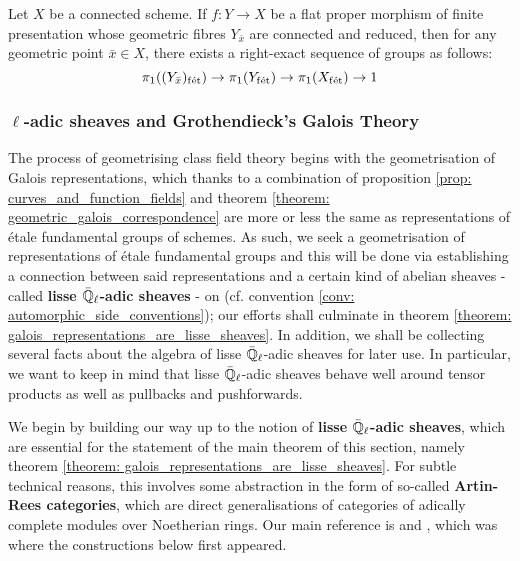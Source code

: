             \begin{proposition} \label{prop: etale_homotopy_exact_sequence}
                \cite[\href{https://stacks.math.columbia.edu/tag/0C0J}{Tag 0C0J}]{stacks} Let $X$ be a connected scheme. If $f: Y \to X$ be a flat proper morphism of finite presentation whose geometric fibres $Y_{\bar{x}}$ are connected and reduced, then for any geometric point $\bar{x} \in X$, there exists a right-exact sequence of groups as follows:
                    $$\pi_1((Y_{\bar{x}})_{\mathrm{f\acute{e}t}}) \to \pi_1(Y_{\mathrm{f\acute{e}t}}) \to \pi_1(X_{\mathrm{f\acute{e}t}}) \to 1$$
            \end{proposition}
        
        \subsubsection{\texorpdfstring{$\ell$}{}-adic sheaves and Grothendieck's Galois Theory}
            The process of geometrising class field theory begins with the geometrisation of Galois representations, which thanks to a combination of proposition \ref{prop: curves_and_function_fields} and theorem \ref{theorem: geometric_galois_correspondence} are more or less the same as representations of \'etale fundamental groups of schemes. As such, we seek a geometrisation of representations of \'etale fundamental groups and this will be done via establishing a connection between said representations and a certain kind of abelian sheaves - called \textbf{lisse $\bar{\mathbb{Q}}_{\ell}$-adic sheaves} - on  (cf. convention \ref{conv: automorphic_side_conventions}); our efforts shall culminate in theorem \ref{theorem: galois_representations_are_lisse_sheaves}. In addition, we shall be collecting several facts about the algebra of lisse $\bar{\mathbb{Q}}_{\ell}$-adic sheaves for later use. In particular, we want to keep in mind that lisse $\bar{\mathbb{Q}}_{\ell}$-adic sheaves behave well around tensor products as well as pullbacks and pushforwards.  
            
            We begin by building our way up to the notion of \textbf{lisse $\bar{\mathbb{Q}}_{\ell}$-adic sheaves}, which are essential for the statement of the main theorem of this section, namely theorem \ref{theorem: galois_representations_are_lisse_sheaves}. For subtle technical reasons, this involves some abstraction in the form of so-called \textbf{Artin-Rees categories}, which are direct generalisations of categories of adically complete modules over Noetherian rings. Our main reference is \cite[Subsection 1.4]{conrad_etale_cohomology} and \cite[Expos\'e V]{sga5}, which was where the constructions below first appeared.
        
